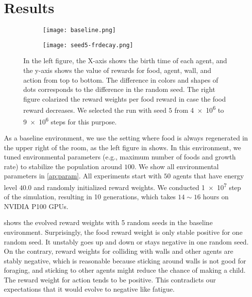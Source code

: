 \section{Results}

\begin{figure}[t]
  \begin{subfigure}[t]{7.5cm}
    \centering
    \texttt{[image: baseline.png]}
    \label{subfigure:bl}
  \end{subfigure}
  \begin{subfigure}[t]{7.5cm}
    \centering
    \texttt{[image: seed5-frdecay.png]}
    \label{subfigure:s5cs}
  \end{subfigure}
  \caption{
    In the left figure, the X-axis shows the birth time of each agent, and the y-axis shows the value of rewards for food, agent, wall, and action from top to bottom. The difference in colors and shapes of dots corresponds to the difference in the random seed. The right figure colarized the reward weights per food reward in case the food reward decreases. We selected the run with seed $5$ from \num{4e6} to \num{9e6} steps for this purpose.
  }\label{figure:baseline-result}
\end{figure}

As a baseline environment, we use the setting where food is always regenerated in the upper right of the room, as the left figure in  shows. In this environment, we tuned environmental parameters (e.g., maximum number of foods and growth rate) to stabilize the population around $100$. We show all environmental parameters in \cref{ap:param}. All experiments start with $50$ agents that have energy level $40.0$ and randomly initialized reward weights. We conducted \num{1e7} step of the simulation, resulting in 10  generations, which takes $14\sim16$ hours on NVIDIA P100 GPUs.

 shows the evolved reward weights with 5 random seeds in the baseline environment. Surprisingly, the food reward weight is only stable positive for one random seed. It unstably goes up and down or stays negative in one random seed. On the contrary, reward weights for colliding with walls and other agents are stably negative, which is reasonable because sticking around walls is not good for foraging, and sticking to other agents might reduce the chance of making a child. The reward weight for action tends to be positive. This contradicts our expectations that it would evolve to negative like fatigue.

